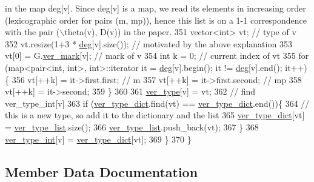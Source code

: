 \begin{DoxyCode}
{       in the map deg[v]. Since deg[v] is a map, we read its elements in increasing order (lexicographic order for
       pairs (m, mp)), hence this list is on a 1-1 correspondence with the pair (\(\backslash\)theta(v), D(v)) in the paper.}
351     vector<int> vt; \textcolor{comment}{// type of v}
352     vt.resize(1+3 * \hyperlink{classcolored__graph_ae3269d35c1b022bc70d195bebd4e1b8a}{deg}[v].size()); \textcolor{comment}{// motivated by the above explanation}
353     vt[0] = G.\hyperlink{classmarked__graph_ac83e9377dd4d8bb95be1ac949b127296}{ver\_mark}[v]; \textcolor{comment}{// mark of v}
354     \textcolor{keywordtype}{int} k = 0; \textcolor{comment}{// current index of vt}
355     \textcolor{keywordflow}{for} (map<pair<int, int>, \textcolor{keywordtype}{int}>::iterator it = \hyperlink{classcolored__graph_ae3269d35c1b022bc70d195bebd4e1b8a}{deg}[v].begin(); it != \hyperlink{classcolored__graph_ae3269d35c1b022bc70d195bebd4e1b8a}{deg}[v].end(); it++)\{
356       vt[++k] = it->first.first; \textcolor{comment}{// m}
357       vt[++k] = it->first.second; \textcolor{comment}{// mp}
358       vt[++k] = it->second;
359     \}
360 
361     \hyperlink{classcolored__graph_a2cc32e7146fa3319f83cfa940f5e1be4}{ver\_type}[v] = vt;
362     \textcolor{comment}{// find ver\_type\_int[v]}
363     \textcolor{keywordflow}{if} (\hyperlink{classcolored__graph_aeb780762429ddac375799f4a45405712}{ver\_type\_dict}.find(vt) == \hyperlink{classcolored__graph_aeb780762429ddac375799f4a45405712}{ver\_type\_dict}.end())\{
364       \textcolor{comment}{// this is a new type, so add it to the dictionary and the list }
365       \hyperlink{classcolored__graph_aeb780762429ddac375799f4a45405712}{ver\_type\_dict}[vt] = \hyperlink{classcolored__graph_a3a1ae8abac458d20a2afb4aa48bbc956}{ver\_type\_list}.size();
366       \hyperlink{classcolored__graph_a3a1ae8abac458d20a2afb4aa48bbc956}{ver\_type\_list}.push\_back(vt);
367     \}
368     \hyperlink{classcolored__graph_a491ed2ea1a65118af02ec606c8d44c0a}{ver\_type\_int}[v] = \hyperlink{classcolored__graph_aeb780762429ddac375799f4a45405712}{ver\_type\_dict}[vt];
369   \}
370 \}
\end{DoxyCode}


\subsection{Member Data Documentation}
\mbox{\label{classcolored__graph_a45dce16965079286cf3f41a54a1b2ea4}} 
